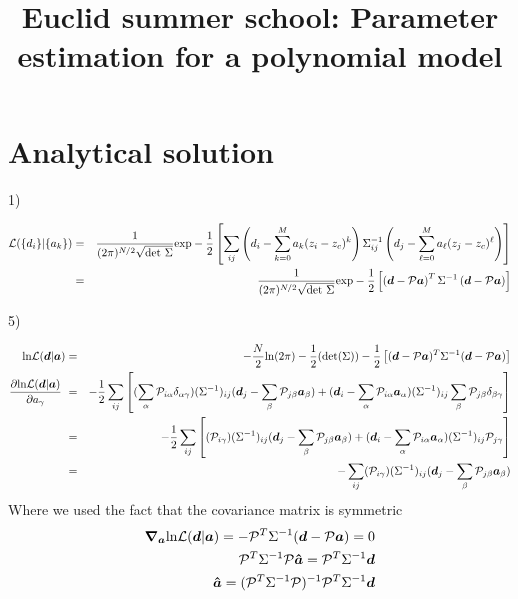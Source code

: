 \documentclass[a4paper]{article}
\title{ Euclid summer school: Parameter estimation for a polynomial model}
\def\ba{\begin{eqnarray}}
\def\ea{\end{eqnarray}}
\begin{document}
\maketitle


\section{Analytical solution}

1) 

\ba
{\cal L}( \{d_{i} \} | \{a_{k} \}) &=& \frac{1}{(2\pi)^{N/2} \sqrt{\rm  det \ \Sigma} } {\rm exp}  - \frac{1}{2} \left[ \sum_{ij} \left( d_{i}  -\sum_{k=0}^{M} a_{k}  (z_{i}-z_{c})^{k} \right)    \Sigma_{ij}^{-1}  \left( d_{j}  -\sum_{\ell=0}^{M} a_{\ell}  (z_{j}-z_{c})^{\ell} \right)  \right]  \nonumber \\
&=& \frac{1}{(2\pi)^{N/2} \sqrt{\rm  det \ \Sigma} } {\rm exp}  - \frac{1}{2} \left[  \left( \bm{d} - {\cal P} \bm{a} \right)^{T}    \Sigma^{-1}  \left( \bm{d} - {\cal P} \bm{a} \right)  \right]
\ea

5)

\ba
{\rm ln}{\cal L}(\bm{d} | \bm{a}) &=& -\frac{N}{2} {\rm ln}(2\pi) - \frac{1}{2} ({\rm det}( \Sigma)) -\frac{1}{2} \left[ ( \bm{d} - {\cal P}\bm{a})^{T} \Sigma^{-1}   ( \bm{d} - {\cal P}\bm{a})\right]  \nonumber \\
\frac{\partial{\rm ln}{\cal L}(\bm{d} | \bm{a})}{\partial a_{\gamma}}  &=&   - \frac{1}{2} \sum_{ij} \left[ (  \sum_{\alpha}{\cal P}_{i\alpha}\delta_{\alpha\gamma}) (\Sigma^{-1})_{ij}   ( \bm{d}_{j} - \sum_{\beta}{\cal P}_{j\beta}\bm{a}_{\beta}) + ( \bm{d}_{i} - \sum_{\alpha}{\cal P}_{i\alpha}\bm{a}_{\alpha}) (\Sigma^{-1})_{ij}  \sum_{\beta}{\cal P}_{j\beta} \delta_{\beta\gamma} \right]   \nonumber \nonumber \\
&=&   - \frac{1}{2} \sum_{ij} \left[ (  {\cal P}_{i\gamma}) (\Sigma^{-1})_{ij}   ( \bm{d}_{j} - \sum_{\beta}{\cal P}_{j\beta}\bm{a}_{\beta}) + ( \bm{d}_{i} - \sum_{\alpha}{\cal P}_{i\alpha}\bm{a}_{\alpha}) (\Sigma^{-1})_{ij}  {\cal P}_{j\gamma} \right]   \nonumber \\
&=&  -  \sum_{ij}  (  {\cal P}_{i\gamma}) (\Sigma^{-1})_{ij}   ( \bm{d}_{j} - \sum_{\beta}{\cal P}_{j\beta}\bm{a}_{\beta})  
\ea
Where we used  the fact that the covariance matrix is symmetric
\ba
\bm{\nabla}_{\bm{a}} {\rm ln}{\cal L}(\bm{d} | \bm{a}) = - {\cal P}^{T}  \Sigma^{-1}( \bm{d} - {\cal P}\bm{a}) = 0   \\
 {\cal P}^{T}  \Sigma^{-1}{\cal P}\bm{\hat{a}} = {\cal P}^{T}  \Sigma^{-1} \bm{d} \nonumber  \\
    \bm{\hat{a}} = ( {\cal P}^{T}  \Sigma^{-1}{\cal P})^{-1}{\cal P}^{T}  \Sigma^{-1} \bm{d} 
\ea
\end{document}
